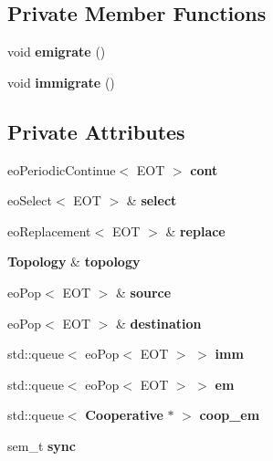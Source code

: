 \subsection*{Private Member Functions}
\begin{CompactItemize}
\item 
void {\bf emigrate} ()\label{classpeo_sync_island_mig_4c8416e3acce1a6e4c3b0a442d94b063}

\item 
void {\bf immigrate} ()\label{classpeo_sync_island_mig_38dd72312a3d16808af1aa7beb9ed4a7}

\end{CompactItemize}
\subsection*{Private Attributes}
\begin{CompactItemize}
\item 
eo\-Periodic\-Continue$<$ EOT $>$ {\bf cont}\label{classpeo_sync_island_mig_2d8ae9104376f3e073e0b250d9b425a2}

\item 
eo\-Select$<$ EOT $>$ \& {\bf select}\label{classpeo_sync_island_mig_5e9c9f5f65d6418ad46e647ee1804a3d}

\item 
eo\-Replacement$<$ EOT $>$ \& {\bf replace}\label{classpeo_sync_island_mig_cb6d2d909503a86415912900d6e1d891}

\item 
{\bf Topology} \& {\bf topology}\label{classpeo_sync_island_mig_ebfe6edb6be16d46bf6d71cb233fcace}

\item 
eo\-Pop$<$ EOT $>$ \& {\bf source}\label{classpeo_sync_island_mig_33fde1f09faf2a3f772d8b8f6a2615c6}

\item 
eo\-Pop$<$ EOT $>$ \& {\bf destination}\label{classpeo_sync_island_mig_a9bf4612c7c04da6cf69245c6617e6a6}

\item 
std::queue$<$ eo\-Pop$<$ EOT $>$ $>$ {\bf imm}\label{classpeo_sync_island_mig_088c1623f32668dcd3683fceff9426c3}

\item 
std::queue$<$ eo\-Pop$<$ EOT $>$ $>$ {\bf em}\label{classpeo_sync_island_mig_11d6dd3e4a6db710433f501af0988322}

\item 
std::queue$<$ {\bf Cooperative} $\ast$ $>$ {\bf coop\_\-em}\label{classpeo_sync_island_mig_2f7ca18d67ab7fb47a9851ab3179eb7d}

\item 
sem\_\-t {\bf sync}\label{classpeo_sync_island_mig_91e0e1ea59c2a6a66eb496bddd60a18f}

\end{CompactItemize}


